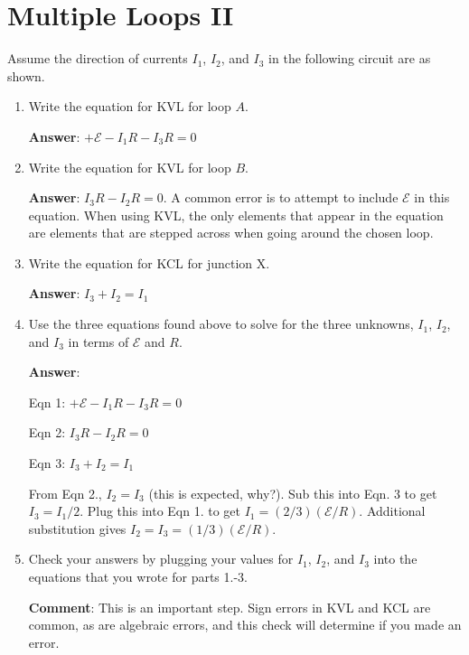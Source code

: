 \documentclass{article}
\begin{document}

\section{Multiple Loops II}

Assume the direction of currents $I_1$, $I_2$, and $I_3$ in the following circuit are as shown.



\begin{enumerate}

  \item Write the equation for KVL for loop $A$.

        \ifsolutions
        \textbf{Answer}: $+\mathcal{E}-I_1R-I_3R=0$
        \else
        \vskip 36pt
        \fi

  \item Write the equation for KVL for loop $B$.

        \ifsolutions
        \textbf{Answer}: $I_3R-I_2R=0$. A common error is to attempt to include $\mathcal{E}$ in this equation. When using KVL, the only elements that appear in the equation are elements that are stepped across when going around the chosen loop.
        \else
        \vskip 36pt
        \fi

  \item Write the equation for KCL for junction X.

        \ifsolutions
        \textbf{Answer}: $I_3+I_2=I_1$
        \else
        \vskip 36pt
        \fi

  \item Use the three equations found above to solve for the three unknowns, $I_1$, $I_2$, and $I_3$ in terms of $\mathcal{E}$ and $R$.

        \ifsolutions
        \textbf{Answer}:

        Eqn 1: $+\mathcal{E}-I_1R-I_3R=0$

        Eqn 2: $I_3R-I_2R=0$

        Eqn 3: $I_3+I_2=I_1$

        From Eqn 2., $I_2=I_3$ (this is expected, why?). Sub this into Eqn. 3 to get $I_3=I_1/2$. Plug this into Eqn 1. to get $I_1=(2/3)(\mathcal{E}/R)$. Additional substitution gives $I_2=I_3=(1/3)(\mathcal{E}/R)$.
        \else
        \vskip 96pt
        \fi

  \item Check your answers by plugging your values for $I_1$, $I_2$, and $I_3$ into the equations that you wrote for parts 1.-3.

        \ifsolutions
        \textbf{Comment}: This is an important step. Sign errors in KVL and KCL are common, as are algebraic errors, and this check will determine if you made an error.
        \else

        \newpage
        \fi

\end{enumerate}
\end{document}
